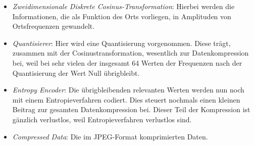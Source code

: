 \begin{itemize}
    \item \emph{Zweidimensionale Diskrete Cosinus-Transformation}: Hierbei werden die Informationen, die als Funktion des Orts vorliegen, in Amplituden von Ortsfrequenzen gewandelt.
    \item \emph{Quantisierer}: Hier wird eine Quantisierung vorgenommen.
    Diese trägt, zusammen mit der Cosinustransformation, wesentlich zur Datenkompression bei, weil bei sehr vielen der insgesamt 64 Werten der Frequenzen nach der Quantisierung der Wert Null übrigbleibt.
    \item \emph{Entropy Encoder}: Die übrigbleibenden relevanten Werten werden nun noch mit einem Entropieverfahren codiert.
    Dies steuert nochmals einen kleinen Beitrag zur gesamten Datenkompression bei.
    Dieser Teil der Kompression ist gänzlich verlustlos, weil Entropieverfahren verlustlos sind.
    \item \emph{Compressed Data}: Die im JPEG-Format komprimierten Daten.
\end{itemize}